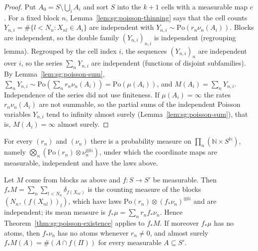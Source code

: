 \begin{proof}
  \leanok
{}
Put $A_0=S\setminus\bigcup_iA_i$ and sort $S$ into the $k+1$ cells with a measurable map $c$. For a fixed block $n$, Lemma~\ref{lem:sg:poisson-thinning} says that the cell counts $Y_{n,i}=\#\{l<N_n:X_{nl}\in A_i\}$ are independent with $Y_{n,i}\sim\mathrm{Po}(r_n\nu_n(A_i))$. Blocks are independent, so the double family $(Y_{n,i})_{n,i}$ is independent (regrouping lemma). Regrouped by the cell index $i$, the sequences $(Y_{n,i})_n$ are independent over $i$, so the series $\sum_nY_{n,i}$ are independent (functions of disjoint subfamilies). By Lemma~\ref{lem:sg:poisson-sum}, $\sum_nY_{n,i}\sim\mathrm{Po}(\sum_nr_n\nu_n(A_i))=\mathrm{Po}(\mu(A_i))$, and $M(A_i)=\sum_nY_{n,i}$. Independence of the series did not use finiteness. If $\mu(A_i)=\infty$ the rates $r_n\nu_n(A_i)$ are not summable, so the partial sums of the independent Poisson variables $Y_{n,i}$ tend to infinity almost surely (Lemma~\ref{lem:sg:poisson-sum}), that is, $M(A_i)=\infty$ almost surely.
\end{proof}

\begin{lemma}\label{thm:sg:poisson-blocks-exist}
  \leanok
For every $(r_n)$ and $(\nu_n)$ there is a probability measure on $\prod_n(\mathbb N\times S^{\mathbb N})$, namely $\bigotimes_n(\mathrm{Po}(r_n)\otimes\nu_n^{\otimes\mathbb N})$, under which the coordinate maps are measurable, independent and have the laws above.
\end{lemma}

\begin{theorem}\label{thm:sg:poisson-map}
  \leanok
Let $M$ come from blocks as above and $f:S\to S'$ be measurable. Then $f_*M=\sum_n\sum_{l<N_n}\delta_{f(X_{nl})}$ is the counting measure of the blocks $(N_n,(f(X_{nl}))_l)$, which have laws $\mathrm{Po}(r_n)\otimes(f_*\nu_n)^{\otimes\mathbb N}$ and are independent; its mean measure is $f_*\mu=\sum_nr_nf_*\nu_n$. Hence Theorem~\ref{thm:sg:poisson-existence} applies to $f_*M$. If moreover $f_*\mu$ has no atoms, then $f_*\nu_n$ has no atoms whenever $r_n\ne0$, and almost surely $f_*M(A)=\#(A\cap f(\Pi))$ for every measurable $A\subseteq S'$.
\end{theorem}

